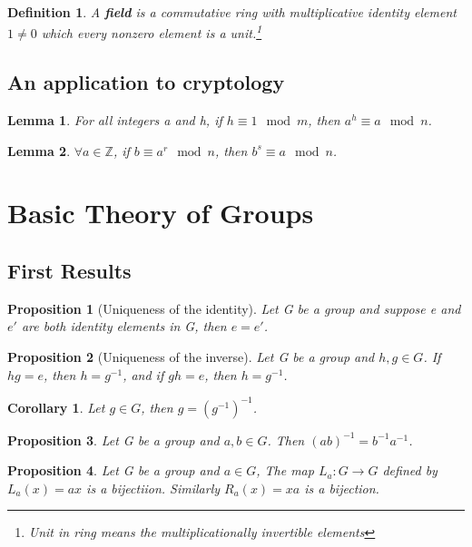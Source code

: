 \documentclass[12pt]{article}
\newtheorem{definition}{Definition}[subsection]
\newtheorem{proposition}{Proposition}[subsection]
\newtheorem{lemma}{Lemma}[subsection]
\newtheorem{corollary}{Corollary}[subsection]
\begin{document}
\begin{definition}
    A \textbf{field} is a commutative ring with multiplicative identity element $1 \neq 0$ which every nonzero element is a unit.\footnote{Unit in ring means the multiplicationally invertible elements}
\end{definition}

\subsection{An application to cryptology}

\begin{lemma}
    For all integers a and h, if $h \equiv 1 \mod m$, then $a^h \equiv a \mod n$.
\end{lemma}
\begin{lemma}
    $\forall a \in \mathbb{Z}$, if $b \equiv a^r \mod n$, then $b^s \equiv a \mod n$.
\end{lemma}

\section{Basic Theory of Groups}
    \subsection{First Results}
    \begin{proposition}[Uniqueness of the identity]
        Let G be a group and suppose e and $e'$ are both identity elements in G, then $e = e'$.
    \end{proposition}
    \begin{proposition}[Uniqueness of the inverse]
        Let G be a group and $h, g \in G$. If $hg = e$, then $h = g^{-1}$, and if $gh = e$, then $h=g^{-1}$.
    \end{proposition}
    
    \begin{corollary}
        Let $g \in G$, then $g = (g^{-1})^{-1}$.
    \end{corollary}

    \begin{proposition}
        Let G be a group and $a, b \in G$. Then $(ab)^{-1} = b^{-1}a^{-1}$. 
    \end{proposition}

    \begin{proposition}
        Let G be a group and $a \in G$, The map $L_a:G\rightarrow G$ defined by $L_a(x)=ax$ is a bijectiion. Similarly $R_a(x)=xa$ is a bijection.
    \end{proposition}
    
\end{document}
